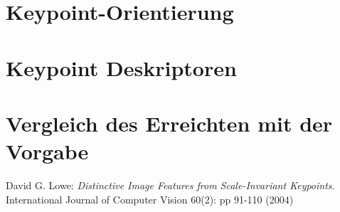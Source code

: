 \documentclass[a4paper,12pt]{scrartcl}
\begin{document}
\section{Keypoint-Orientierung}

\section{Keypoint Deskriptoren}

\section{Vergleich des Erreichten mit der Vorgabe}

\newpage
\begin{thebibliography}{------}
  David G. Lowe: {\em Distinctive Image Features from Scale-Invariant Keypoints}. 
  International Journal of Computer Vision 60(2): pp 91-110 (2004)
\end{thebibliography}
\end{document}
